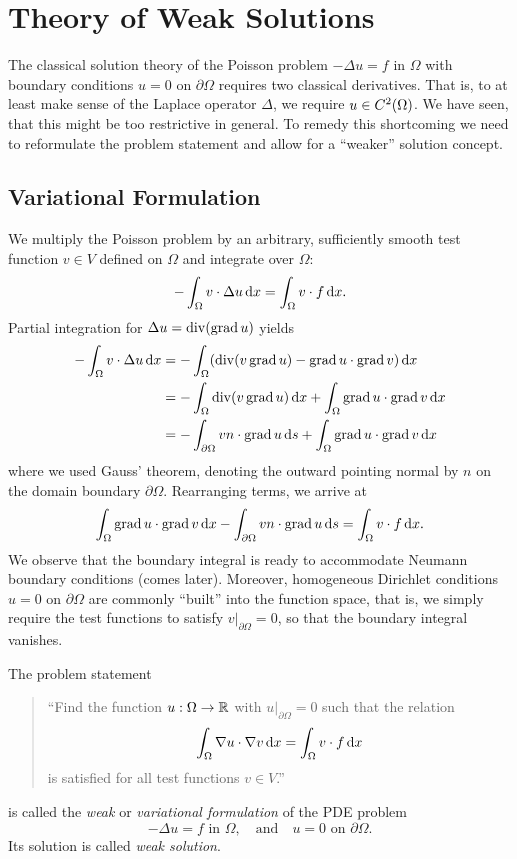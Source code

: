 \section{Theory of Weak Solutions}

The classical solution theory of the Poisson problem \(-\Delta u = f\) in \(\Omega\) with boundary conditions \(u = 0\) on \(\partial\Omega\) requires two classical derivatives.
That is, to at least make sense of the Laplace operator \(\Delta\), we require \(u \in C^2\parentheses*{\Omega}\).
We have seen, that this might be too restrictive in general.
To remedy this shortcoming we need to reformulate the problem statement and allow for a ``weaker'' solution concept.


\subsection{Variational Formulation}

We multiply the Poisson problem by an arbitrary, sufficiently smooth test function \(v \in V\) defined on \(\Omega\) and integrate over \(\Omega\):
\[
	-\int_\Omega v \cdot \Delta u\mathop{\mathrm{d}\!} x = \int_\Omega v \cdot f\mathop{\mathrm{d}\!} x.
\]
Partial integration for \(\Delta u = \div\parentheses*{\grad u}\) yields
\begin{align*}
	-\int_\Omega v \cdot \Delta u\d x &= -\int_\Omega \parentheses*{\div\parentheses*{v\grad u} - \grad u \cdot \grad v}\d x\\
	&= -\int_\Omega \div\parentheses*{v\grad u}\d x + \int_\Omega \grad u \cdot \grad v\d x\\
	&= -\int_{\partial\Omega}vn \cdot \grad u\d s + \int_\Omega \grad u \cdot \grad v\d x
\end{align*}
where we used Gauss' theorem, denoting the outward pointing normal by \(n\) on the domain boundary \(\partial\Omega\).
Rearranging terms, we arrive at
\[
	\int_\Omega \operatorname{grad} u \cdot \operatorname{grad} v\mathop{\mathrm{d}\!} x - \int_{\partial\Omega}vn \cdot \operatorname{grad} u\mathop{\mathrm{d}\!} s = \int_\Omega v \cdot f\mathop{\mathrm{d}\!} x.
\]
We observe that the boundary integral is ready to accommodate Neumann boundary conditions (comes later).
Moreover, homogeneous Dirichlet conditions \(u = 0\) on \(\partial\Omega\) are commonly ``built'' into the function space, that is, we simply require the test functions to satisfy \(\left.v\right|_{\partial\Omega} = 0\), so that the boundary integral vanishes.

\begin{definition}
	The problem statement
	\begin{quote}
		``Find the function \(u: \Omega \to \mathbb{R}\) with \(\left.u\right|_{\partial\Omega} = 0\) such that the relation
		\[
			\int_\Omega \nabla u \cdot \nabla v\mathop{\mathrm{d}\!} x = \int_\Omega v \cdot f\mathop{\mathrm{d}\!} x
		\]
		is satisfied for all test functions \(v \in V\).''
	\end{quote}
	is called the \emph{weak} or \emph{variational formulation} of the PDE problem
	\[
		-\Delta u = f\text{ in }\Omega, \quad \text{and} \quad u = 0\text{ on }\partial\Omega.
	\]
	Its solution is called \emph{weak solution}.
\end{definition}

